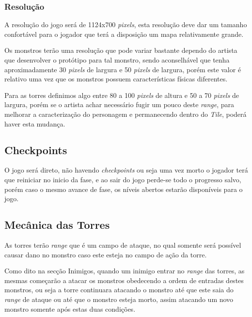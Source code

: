 \documentclass[11pt]{article} %
\begin{document}
\subsubsection{Resolução}
A resolução do jogo será de 1124x700 \textit{pixels}, esta resolução deve dar um tamanho confortável para o jogador que terá a disposição um mapa relativamente grande.

Os monstros terão uma resolução que pode variar bastante dependo do artista que desenvolver o protótipo para tal monstro, sendo aconselhável que tenha aproximadamente 30 \textit{pixels} de largura e 50 \textit{pixels} de largura, porém este valor é relativo uma vez que os monstros possuem características físicas diferentes.

Para as torres definimos algo entre 80 a 100 \textit{pixels} de altura e 50 a 70 \textit{pixels} de largura, porém se o artista achar necessário fugir um pouco deste \textit{range}, para melhorar a caracterização do personagem e permanecendo dentro do \textit{Tile}, poderá haver esta mudança.

\subsection{Checkpoints}
O jogo será direto, não havendo \textit{checkpoints} ou seja uma vez morto o jogador terá que reiniciar no inicio da fase, e ao sair do jogo perde-se todo o progresso salvo, porém caso o mesmo avance de fase, os níveis abertos estarão disponíveis para o jogo.

\subsection{Mecânica das Torres}

As torres terão \textit{range} que é um campo de ataque, no qual somente será possível causar dano no monstro caso este esteja no campo de ação da torre.

Como dito na secção Inimigos, quando um inimigo entrar no \textit{range} das torres, as mesmas começarão a atacar os monstros obedecendo a ordem de entradas destes monstros, ou seja a torre continuara atacando o monstro até que este saia do \textit{range} de ataque ou até que o monstro esteja morto, assim atacando um novo monstro somente após estas duas condições.
\end{document}
